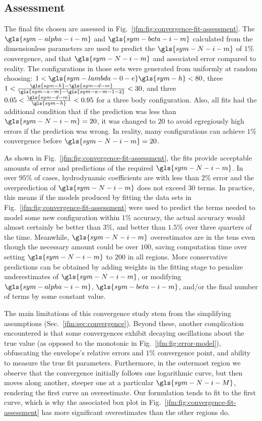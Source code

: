 \documentclass[ASNA,twocolumn]{USG} %
\begin{document}
\subsection{Assessment} \label{jfm:sec:convergence-fit-assessment}

The final fits chosen are assessed in Fig.~\ref{jfm:fig:convergence-fit-assessment}. 
The $\gls{sym-alpha-i-m}$ and $\gls{sym-beta-i-m}$ calculated from the dimensionless parameters are used to predict the $\gls{sym-N-i-m}$ of $1\%$ convergence, and that $\gls{sym-N-i-m}$ and associated error compared to reality. 
The configurations in those sets were generated from uniformly at random choosing: 
$1<\gls{sym-lambda-0-e}\gls{sym-h}<80$, three $1<\frac{\gls{sym-h}-\gls{sym-d-m}}{\gls{sym-a-m}-\gls{sym-a-m-1-2}}<30$, and three $0.05 < \frac{\gls{sym-d-m}}{\gls{sym-h}} < 0.95$ for a three body configuration. 
Also, all fits had the additional condition that if the prediction was less than $\gls{sym-N-i-m} = 20$, it was changed to $20$ to avoid egregiously high errors if the prediction was wrong. 
In reality, many configurations can achieve $1\%$ convergence before $\gls{sym-N-i-m} = 20$.

As shown in Fig.~\ref{jfm:fig:convergence-fit-assessment}, the fits provide acceptable amounts of error and predictions of the required $\gls{sym-N-i-m}$. 
In over $95\%$ of cases, hydrodynamic coefficients are \modelled{} with less than $2\%$ error and the overprediction of $\gls{sym-N-i-m}$ does not exceed $30$ terms. 
In practice, this means if the models produced by fitting the data sets in Fig.~\ref{jfm:fig:convergence-fit-assessment} were used to predict the terms needed to model some new configuration within $1\%$ accuracy, 
the actual accuracy would almost certainly be better than $3\%$, and better than $1.5\%$ over three quarters of the time. 
Meanwhile, $\gls{sym-N-i-m}$ overestimates are in the tens even though the necessary amount could be over $100$, saving computation time over setting $\gls{sym-N-i-m}$ to $200$ in all regions. 
More conservative predictions can be obtained by adding weights in the fitting stage to penalize underestimates of $\gls{sym-N-i-m}$, or modifying $\gls{sym-alpha-i-m}$, $\gls{sym-beta-i-m}$, and/or the final number of terms by some constant value.

The main limitations of this convergence study stem from the simplifying assumptions (Sec.~\ref{jfm:sec:convergence}). 
Beyond these, another complication encountered is that some convergences exhibit decaying oscillations about the true value (as opposed to the monotonic \behaviour{} in Fig.~\ref{jfm:fig:error-model}), 
obfuscating the envelope's relative errors and $1\%$ convergence point, and ability to measure the true fit parameters. 
Furthermore, in the outermost region we observe that the convergence initially follows one logarithmic curve, but then moves along another, steeper one at a particular $\gls{sym-N-i-M}$, rendering the first curve an overestimate. 
Our formulation tends to fit to the first curve, which is why the associated box plot in Fig.~\ref{jfm:fig:convergence-fit-assessment} has more significant overestimates than the other regions do. 
\end{document}
